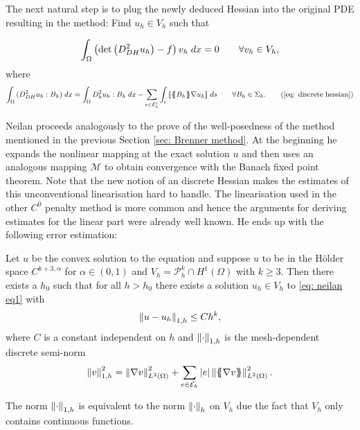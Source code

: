 The next natural step is to plug the newly deduced Hessian into the original \MA PDE resulting in the method: Find $u_h \in V_h$ such that

\begin{align}
		\int_{\Omega} {{ \left(\det{\left(D_{DH}^2 u_h\right)} - f \right) v_h}\;dx} = 0 \qquad \forall v_h \in V_h, \label{eq: neilan eq1}
\end{align}
where
	\begin{align}
		\myIntX  \Omega { (D_{DH}^2 u_h : B_h) }
		= \myIntX  \Omega { D^2_h u_h: B_h}
			 -\sum_{ e \in \edgesi} \myIntS e {  \jump {\average {B_h} \nabla u_h }}\qquad \forall B_h \in \Sigma_h. \tag{\ref{eq: discrete hessian}}
	\end{align}

Neilan proceeds analogously to the prove of the well-posedness of the method mentioned in the previous Section \ref{sec: Brenner method}. At the beginning he expands the nonlinear mapping at the exact solution $u$ and then uses an analogous mapping $\mathcal M$ to obtain convergence with the Banach fixed point theorem. Note that the new notion of an discrete Hessian makes the estimates of this unconventional linearisation hard to handle. The linearisation used in the other $C^0$ penalty method is more common and hence the arguments for deriving estimates for the linear part were already well known.
He ends up with the following error estimation:
\begin{theorem} \label{thm: error estimate Neilan}
	Let $u$ be the convex solution to the \MA equation and suppose $u$ to be in the Hölder space $C^{k+3,\alpha}$ for $\alpha \in (0,1)$ and $V_h = \mathcal P^k_h \cap H^1(\Omega)$ with $k\geq3$. Then there exists a $h_0$ such that for all $h > h_0$ there exists a solution $u_h \in V_h$ to \eqref{eq: neilan eq1} with
	\[
		\left\lVert u-u_h \right\rVert_{1,h} \leq C h^k, 
	\]
	where $C$ is a constant independent on $h$ and $\left\lVert \cdot  \right\rVert_{1,h}$ is the mesh-dependent discrete semi-norm 
	\[
		\left\lVert v \right\rVert_{1,h}^2 = \left\lVert \nabla v  \right\rVert^2_{L^2(\Omega)} + \sum_{e \in \mathcal{E}_h} |e| \left\lVert \{\!\!\{ \nabla v \}\!\!\} \right\rVert^2_{L^2(\Omega)}.
	\]
\end{theorem}
The norm $\left\lVert \cdot \right\rVert_{1,h}$ is equivalent to the norm $\left\lVert \cdot \right\rVert_{h}$ on $V_h$ due the fact that $V_h$ only contains continuous functions.

